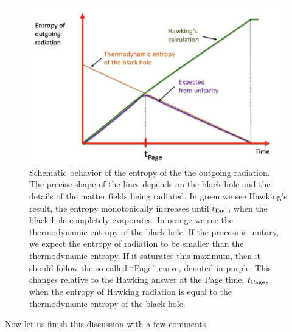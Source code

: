  \begin{figure}[h]
\begin{center}
\includegraphics[scale=.5]{figures/BHPage.png}
\caption{  Schematic behavior of the entropy of the the outgoing radiation.  The precise shape of the lines depends on the black hole and the details of the matter fields being radiated.  In green we see Hawking's result, the entropy monotonically increases until $t_{\rm End}$, when the black hole completely evaporates. In orange we see the thermodynamic entropy of the black hole. If the process is unitary, we expect the entropy of radiation to be smaller than the thermodynamic entropy. If it saturates this maximum, then it should follow the so called ``Page'' curve, denoted in purple. This changes relative to the Hawking answer at the Page time, $t_{\rm Page}$, when the entropy of Hawking radiation is equal to the thermodynamic entropy of the black hole.  }
\label{HawkingPageCurves}
\end{center}
\end{figure}
 
 Now let us finish this discussion with a few comments. 
 
